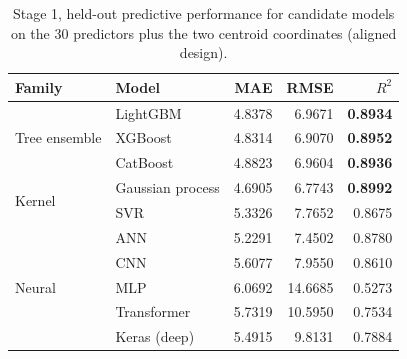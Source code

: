 
\begin{table}[H]
\centering
\caption{Stage 1, held-out predictive performance for candidate models on the 30 predictors plus the two centroid coordinates (aligned design).}
\label{tab:sel_pred_aligned}
\small
\begin{tabular}{llrrr}
\toprule
Family & Model & MAE & RMSE & $R^2$ \\
\midrule
\multirow{3}{*}{Tree ensemble} & LightGBM & 4.8378 & 6.9671 & \textbf{0.8934} \\
 & XGBoost & 4.8314 & 6.9070 & \textbf{0.8952} \\
 & CatBoost & 4.8823 & 6.9604 & \textbf{0.8936} \\
\midrule
\multirow{2}{*}{Kernel} & Gaussian process & 4.6905 & 6.7743 & \textbf{0.8992} \\
 & SVR & 5.3326 & 7.7652 & 0.8675 \\
\midrule
\multirow{5}{*}{Neural} & ANN & 5.2291 & 7.4502 & 0.8780 \\
 & CNN & 5.6077 & 7.9550 & 0.8610 \\
 & MLP & 6.0692 & 14.6685 & 0.5273 \\
 & Transformer & 5.7319 & 10.5950 & 0.7534 \\
 & Keras (deep) & 5.4915 & 9.8131 & 0.7884 \\
\bottomrule
\end{tabular}
\end{table}

